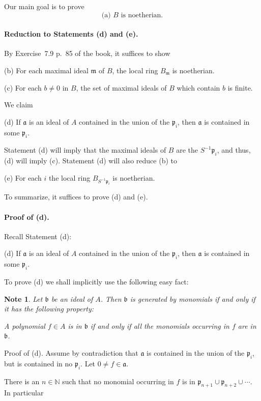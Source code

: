 \documentclass[12pt,letterpaper]{article}%
\newcommand{\mf}{\mathfrak}
\newcommand{\aaa}{\mf a}
\newcommand{\bbb}{\mf b}
\newcommand{\mmm}{\mf m}
\newcommand{\ppp}{\mf p}
\newcommand{\nn}{\noindent}
\newtheorem{note}[thm]{Note}
\begin{document}
Our main goal is to prove 
$$
\text{(a) $B$ is noetherian.} 
$$ 
\paragraph{Reduction to Statements (d) and (e).}

By Exercise~7.9 p.~85 of the book, it suffices to show 

\nn(b) For each maximal ideal $\mmm$ of $B$, the local ring $B_\mmm$ is noetherian.

\nn(c) For each $b\ne0$ in $B$, the set of maximal ideals of $B$ which contain $b$ is
finite.

We claim 

\nn(d) If $\aaa$ is an ideal of $A$ contained in the union of the $\ppp_i$, then $\aaa$ is contained in some $\ppp_i$.

Statement (d) will imply that the maximal ideals of $B$ are the $S^{-1}\ppp_i$, and thus, (d) will imply (c). Statement (d) will also reduce (b) to 

\nn(e) For each $i$ the local ring $B_{S^{-1}\ppp_i}$ is noetherian.

To summarize, it suffices to prove (d) and (e). 

\paragraph{Proof of (d).}

Recall Statement (d):

\nn(d) If $\aaa$ is an ideal of $A$ contained in the union of the $\ppp_i$, then $\aaa$ is contained in some $\ppp_i$.

To prove (d) we shall implicitly use the following easy fact: 

\begin{note}\label{monid}
Let $\bbb$ be an ideal of $A$. Then $\bbb$ is generated by monomials if and only if it has the following property:

A polynomial $f\in A$ is in $\bbb$ if and only if all the monomials occurring in $f$ are in $\bbb$.
\end{note}

\nn Proof of (d). Assume by contradiction that $\aaa$ is contained in the union of the $\ppp_i$, but is contained in no $\ppp_i$. Let $0\ne f\in\aaa$. 

There is an $n\in\mathbb N$ such that no monomial occurring in $f$ is in $\ppp_{n+1}\cup\ppp_{n+2}\cup\cdots$. In particular 
\end{document}
